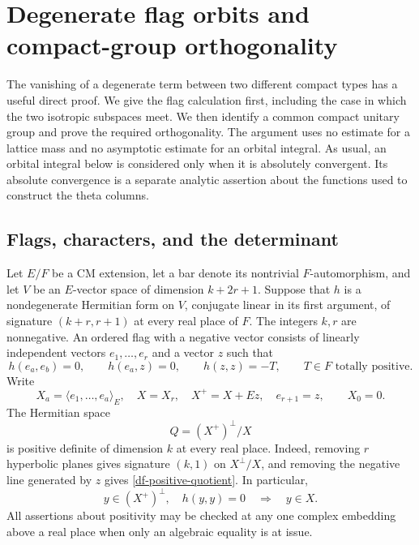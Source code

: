 \section{Degenerate flag orbits and compact-group orthogonality}
\label{df-section}

The vanishing of a degenerate term between two different compact
types has a useful direct proof.  We give the flag calculation first,
including the case in which the two isotropic subspaces meet.  We then
identify a common compact unitary group and prove the required
orthogonality.  The argument uses no estimate for a lattice mass and
no asymptotic estimate for an orbital integral.  As usual, an orbital
integral below is considered only when it is absolutely convergent.
Its absolute convergence is a separate analytic assertion about the
functions used to construct the theta columns.

\subsection{Flags, characters, and the determinant}

Let $E/F$ be a CM extension, let a bar denote its nontrivial
$F$-automorphism, and let $V$ be an $E$-vector space of dimension
$k+2r+1$.  Suppose that $h$ is a nondegenerate Hermitian form on $V$,
conjugate linear in its first argument, of signature
$(k+r,r+1)$ at every real place of $F$.  The integers $k,r$ are
nonnegative.  An ordered flag with a negative vector consists of
linearly independent vectors $e_1,\ldots,e_r$ and a vector $z$ such
that
\[
 h(e_a,e_b)=0,\qquad h(e_a,z)=0,\qquad h(z,z)=-T,
 \qquad T\in F\text{ totally positive}.
\]
Write
\[
 X_a=\langle e_1,\ldots,e_a\rangle_E,\quad
 X=X_r,\quad X^+=X+Ez,\quad e_{r+1}=z,
 \qquad X_0=0.
\]
The Hermitian space
\begin{equation}\label{df-positive-quotient}
 Q=(X^+)^\perp/X
\end{equation}
is positive definite of dimension $k$ at every real place.  Indeed,
removing $r$ hyperbolic planes gives signature $(k,1)$ on
$X^\perp/X$, and removing the negative line generated by $z$ gives
\eqref{df-positive-quotient}.  In particular,
\begin{equation}\label{df-isotropic-in-perp}
 y\in(X^+)^\perp,\quad h(y,y)=0\quad\Longrightarrow\quad y\in X.
\end{equation}
All assertions about positivity may be checked at any one complex
embedding above a real place when only an algebraic equality is at issue.

